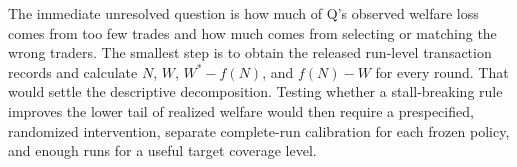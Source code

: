\documentclass{article}
\begin{document}
The immediate unresolved question is how much of Q's observed welfare loss comes from too few trades and how much comes from selecting or matching the wrong traders. The smallest step is to obtain the released run-level transaction records and calculate \(N\), \(W\), \(W^*-f(N)\), and \(f(N)-W\) for every round. That would settle the descriptive decomposition. Testing whether a stall-breaking rule improves the lower tail of realized welfare would then require a prespecified, randomized intervention, separate complete-run calibration for each frozen policy, and enough runs for a useful target coverage level. 
\end{document}
